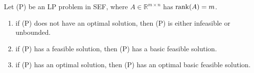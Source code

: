 \begin{thmbox}
    \begin{theorem}
        Let (P) be an LP problem in SEF, where $ A\in \mathbb{R}^{m\times n} $ has $ \operatorname{rank}(A)=m $.
        \begin{enumerate}[(1)]
            \item if (P) does not have an optimal solution, then (P) is either infeasible or unbounded.
            \item if (P) has a feasible solution, then (P) has a basic feasible solution.
            \item if (P) has an optimal solution, then (P) has an optimal basic feasible solution.
        \end{enumerate}
    \end{theorem}
\end{thmbox}
